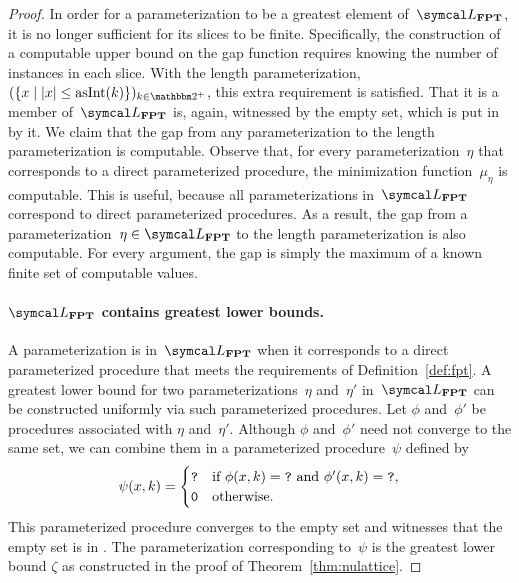 \begin{proof}
  In order for a parameterization to be a greatest element of~$\calL_\cl{FPT}$, it is no longer sufficient for its slices to be finite.
  Specifically, the construction of a computable upper bound on the gap function requires knowing the number of instances in each slice.
  With the length parameterization, $(\{x \st \length{x} \le \asNat(k)\})_{k \in \binary^+}$, this extra requirement is satisfied.
  That it is a member of~$\calL_\cl{FPT}$ is, again, witnessed by the empty set, which is put in  by it.
  We claim that the gap from any parameterization to the length parameterization is computable.
  Observe that, for every parameterization~$\eta$ that corresponds to a direct parameterized procedure, the minimization function~$\mu_\eta$ is computable.
  This is useful, because all parameterizations in~$\calL_\cl{FPT}$ correspond to direct parameterized procedures.
  As a result, the gap from a parameterization~$\eta \in \calL_\cl{FPT}$ to the length parameterization is also computable.
  For every argument, the gap is simply the maximum of a known finite set of computable values.

  \paragraph{$\calL_\cl{FPT}$ contains greatest lower bounds.}
  A parameterization is in~$\calL_\cl{FPT}$ when it corresponds to a direct parameterized procedure that meets the requirements of Definition~\ref{def:fpt}.
  A greatest lower bound for two parameterizations~$\eta$ and~$\eta'$ in~$\calL_\cl{FPT}$ can be constructed uniformly via such parameterized procedures.
  Let $\phi$ and~$\phi'$ be procedures associated with $\eta$ and~$\eta'$.
  Although $\phi$ and~$\phi'$ need not converge to the same set, we can combine them in a parameterized procedure~$\psi$ defined by
  \begin{equation*}
    \psi(x, k) = \begin{cases}
      \textnormal{\texttt{?}}	&\text{if $\phi(x, k) = \textnormal{\texttt{?}}$ and $\phi'(x, k) = \textnormal{\texttt{?}}$}, \\
      \textnormal{\texttt{0}}	&\text{otherwise}.
    \end{cases}
  \end{equation*}
  This parameterized procedure converges to the empty set and witnesses that the empty set is in .
  The parameterization corresponding to~$\psi$ is the greatest lower bound $\zeta$ as constructed in the proof of Theorem~\ref{thm:nulattice}.


\end{proof}
